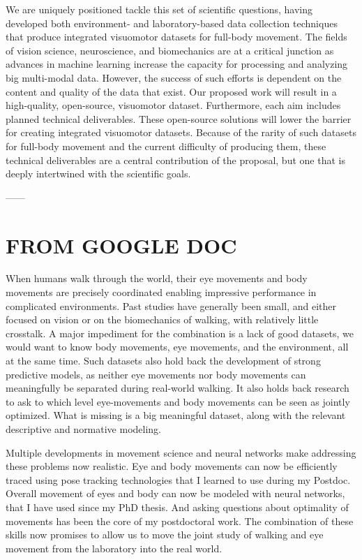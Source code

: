 We are uniquely positioned tackle this set of scientific questions, having developed both environment- and laboratory-based data collection techniques that produce integrated visuomotor datasets for full-body movement.  The fields of vision science, neuroscience, and biomechanics are at a critical junction as advances in machine learning increase the capacity for processing and analyzing big multi-modal data.  However, the success of such efforts is dependent on the content and quality of the data that exist.  Our proposed work will result in a high-quality, open-source, visuomotor dataset.  Furthermore, each aim includes planned technical deliverables.  These open-source solutions will lower the barrier for creating integrated visuomotor datasets. Because of the rarity of such datasets for full-body movement and the current difficulty of producing them, these technical deliverables are a central contribution of the proposal, but one that is deeply intertwined with the scientific goals.

------

\section*{ FROM GOOGLE DOC}

When humans walk through the world, their eye movements and body movements are precisely coordinated enabling impressive performance in complicated environments. Past studies have generally been small, and either focused on vision or on the biomechanics of walking, with relatively little crosstalk. A major impediment for the combination is a lack of good datasets, we would want to know body movements, eye movements, and the environment, all at the same time. Such datasets also hold back the development of strong predictive models, as neither eye movements nor body movements can meaningfully be separated during real-world walking. It also holds back research to ask to which level eye-movements and body movements can be seen as jointly optimized. What is missing is a big meaningful dataset, along with the relevant descriptive and normative modeling.

Multiple developments in movement science and neural networks make addressing these problems now realistic. Eye and body movements can now be efficiently traced using pose tracking technologies that I learned to use during my Postdoc. Overall movement of eyes and body can now be modeled with neural networks, that I have used since my PhD thesis. And asking questions about optimality of movements has been the core of my postdoctoral work. The combination of these skills now promises to allow us to move the joint study of walking and eye movement from the laboratory into the real world.


